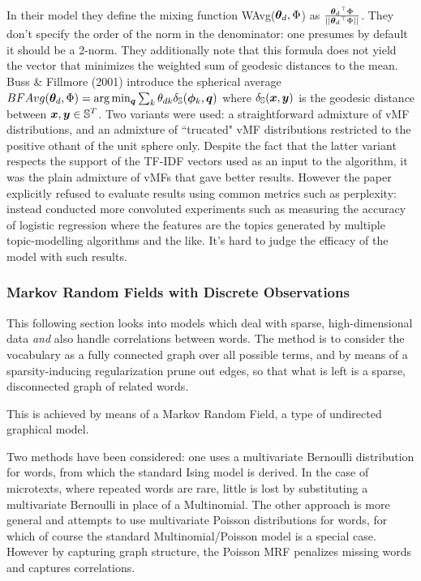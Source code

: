 In their model they define the mixing function WAvg(${ \bm \theta_d }, \Phi$) as $\frac{{ \bm \theta_d }^\top\Phi}{||{ \bm \theta_d }^\top\Phi||}$. They don't specify the order of the norm in the denominator: one presumes by default it should be a 2-norm. They additionally note that this formula does not yield the vector that minimizes the weighted sum of geodesic distances to the mean. Buss \& Fillmore (2001) introduce the spherical average $BFAvg({ \bm \theta_d },\Phi) = \arg \min_{\bm q} \sum_k { \theta_{dk} } \delta_\mathbb{S}(\bm \phi_k, \bm q)$ where $\delta_\mathbb{S}(\bm x, \bm y)$ is the geodesic distance between $\bm x, \bm y \in \mathbb{S}^T$. 
Two variants were used: a straightforward admixture of vMF distributions, and an admixture of ``trucated" vMF distributions restricted to the positive othant of the unit sphere only. Despite the fact that the latter variant respects the support of the TF-IDF vectors used as an input to the algorithm, it was the plain admixture of vMFs that gave better results. However the paper explicitly refused to evaluate results using common metrics such as perplexity: instead conducted more convoluted experiments such as measuring the accuracy of logistic regression where the features are the topics generated by multiple topic-modelling algorithms and the like. It's hard to judge the efficacy of the model with such results.


\subsubsection{Markov Random Fields with Discrete Observations}
This following section looks into models which deal with sparse, high-dimensional data \emph{and} also handle correlations between words. The method is to consider the vocabulary as a fully connected graph over all possible terms, and by means of a sparsity-inducing regularization prune out edges, so that what is left is a sparse, disconnected graph of related words.

This is achieved by means of a Markov Random Field, a type of undirected graphical model.

Two methods have been considered: one uses a multivariate Bernoulli distribution for words, from which the standard Ising model is derived. In the case of microtexts, where repeated words are rare, little is lost by substituting a multivariate Bernoulli in place of a Multinomial. The other approach is more general and attempts to use multivariate Poisson distributions for words, for which of course the standard Multinomial/Poisson model is a special case. However by capturing graph structure, the Poisson MRF penalizes missing words and captures correlations.

